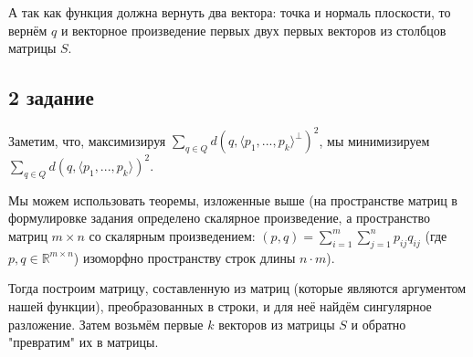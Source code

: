 \documentclass[a4paper]{article}
\begin{document}
А так как функция должна вернуть два вектора: точка и нормаль плоскости, то вернём $q$ и векторное произведение первых двух первых векторов из столбцов матрицы $S$. 

\subsection*{2 задание}

Заметим, что, максимизируя $\sum_{q \in Q} d (q, \langle p_1, ..., p_k \rangle ^ \perp)^2$, мы минимизируем $\sum_{q \in Q} d (q, \langle p_1, ..., p_k \rangle)^2$.

Мы можем использовать теоремы, изложенные выше (на пространстве матриц в формулировке задания определено скалярное произведение, а пространство матриц $m \times n$ со  скалярным произведением: $(p, q) = \sum_{i=1}^{m}\sum_{j=1}^{n} p_{ij}q_{ij}$ (где $p, q \in \mathbb{R}^{m \times n}$) изоморфно пространству строк длины $n \cdot m$).

Тогда построим матрицу, составленную из матриц (которые являются аргументом нашей функции), преобразованных в строки, и для неё найдём сингулярное разложение. Затем возьмём первые $k$ векторов из матрицы $S$ и обратно "превратим" их в матрицы.
\end{document}
